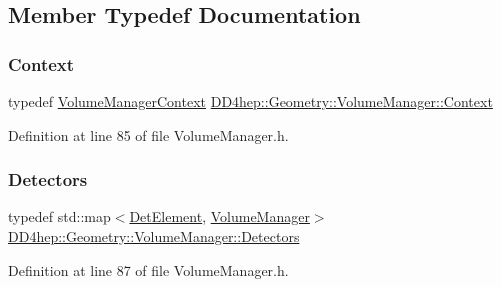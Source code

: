 \subsection{Member Typedef Documentation}
\hypertarget{class_d_d4hep_1_1_geometry_1_1_volume_manager_adadb14f2ccbeaad001b7bc6ddb6dc715}{}\label{class_d_d4hep_1_1_geometry_1_1_volume_manager_adadb14f2ccbeaad001b7bc6ddb6dc715} 
\subsubsection{\texorpdfstring{Context}{Context}}
{\footnotesize\ttfamily typedef \hyperlink{class_d_d4hep_1_1_geometry_1_1_volume_manager_context}{Volume\+Manager\+Context} \hyperlink{class_d_d4hep_1_1_geometry_1_1_volume_manager_adadb14f2ccbeaad001b7bc6ddb6dc715}{D\+D4hep\+::\+Geometry\+::\+Volume\+Manager\+::\+Context}}



Definition at line 85 of file Volume\+Manager.\+h.

\hypertarget{class_d_d4hep_1_1_geometry_1_1_volume_manager_a89d31fb00522aa56dfa2708fedaf1e4f}{}\label{class_d_d4hep_1_1_geometry_1_1_volume_manager_a89d31fb00522aa56dfa2708fedaf1e4f} 
\subsubsection{\texorpdfstring{Detectors}{Detectors}}
{\footnotesize\ttfamily typedef std\+::map$<$\hyperlink{class_d_d4hep_1_1_geometry_1_1_det_element}{Det\+Element}, \hyperlink{class_d_d4hep_1_1_geometry_1_1_volume_manager}{Volume\+Manager}$>$ \hyperlink{class_d_d4hep_1_1_geometry_1_1_volume_manager_a89d31fb00522aa56dfa2708fedaf1e4f}{D\+D4hep\+::\+Geometry\+::\+Volume\+Manager\+::\+Detectors}}



Definition at line 87 of file Volume\+Manager.\+h.

\hypertarget{class_d_d4hep_1_1_geometry_1_1_volume_manager_ad60f5618f569c6604861b6e0eb1c71c9}{}\label{class_d_d4hep_1_1_geometry_1_1_volume_manager_ad60f5618f569c6604861b6e0eb1c71c9} 
